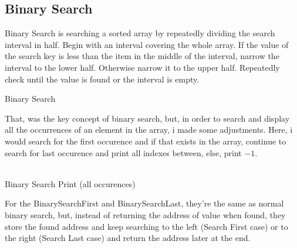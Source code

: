 \documentclass[a4paper]{article}
\begin{document}
\subsection{Binary Search}
Binary Search is searching a sorted array by repeatedly dividing the search interval in half. Begin with an interval covering the whole array. If the value of the search key is less than the item in the middle of the interval, narrow the interval to the lower half. Otherwise narrow it to the upper half. Repeatedly check until the value is found or the interval is empty.\\
\begin{algorithm}[H]
\DontPrintSemicolon
\SetAlgoLined
	\BlankLine  
  \caption{Binary Search}
\end{algorithm}
That, was the key concept of binary search, but, in order to search and display all the occurrences of an element in the array, i made some adjustments. Here, i would search for the first occurence and if that exists in the array, continue to search for last occurence and print all indexes between, else, print $-1$.\\\\
\begin{algorithm}[H]
\DontPrintSemicolon
\SetAlgoLined
	\BlankLine  
  \caption{Binary Search Print (all occurences)}
\end{algorithm}
For the BinarySearchFirst and BinarySearchLast, they're the same as normal binary search, but, instead of returning the address of value when found, they store the found address and keep searching to the left (Search First case) or to the right (Search Last case) and return the address later at the end.\\
\end{document}
